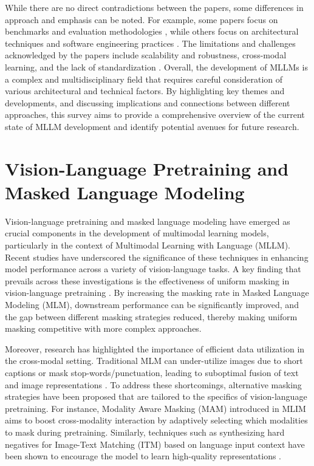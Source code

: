 \documentclass[conference]{IEEEtran}
\begin{document}
While there are no direct contradictions between the papers, some differences in approach and emphasis can be noted. For example, some papers focus on benchmarks and evaluation methodologies \cite{b4, b5}, while others focus on architectural techniques and software engineering practices \cite{b1, b2, b3}. The limitations and challenges acknowledged by the papers include scalability and robustness, cross-modal learning, and the lack of standardization \cite{b1, b4, b5}. Overall, the development of MLLMs is a complex and multidisciplinary field that requires careful consideration of various architectural and technical factors. By highlighting key themes and developments, and discussing implications and connections between different approaches, this survey aims to provide a comprehensive overview of the current state of MLLM development and identify potential avenues for future research.

\section{Vision-Language Pretraining and Masked Language Modeling}
Vision-language pretraining and masked language modeling have emerged as crucial components in the development of multimodal learning models, particularly in the context of Multimodal Learning with Language (MLLM). Recent studies have underscored the significance of these techniques in enhancing model performance across a variety of vision-language tasks. A key finding that prevails across these investigations is the effectiveness of uniform masking in vision-language pretraining \cite{b1}. By increasing the masking rate in Masked Language Modeling (MLM), downstream performance can be significantly improved, and the gap between different masking strategies reduced, thereby making uniform masking competitive with more complex approaches.

Moreover, research has highlighted the importance of efficient data utilization in the cross-modal setting. Traditional MLM can under-utilize images due to short captions or mask stop-words/punctuation, leading to suboptimal fusion of text and image representations \cite{b2}. To address these shortcomings, alternative masking strategies have been proposed that are tailored to the specifics of vision-language pretraining. For instance, Modality Aware Masking (MAM) introduced in MLIM \cite{b3} aims to boost cross-modality interaction by adaptively selecting which modalities to mask during pretraining. Similarly, techniques such as synthesizing hard negatives for Image-Text Matching (ITM) based on language input context have been shown to encourage the model to learn high-quality representations \cite{b4}.
\end{document}
